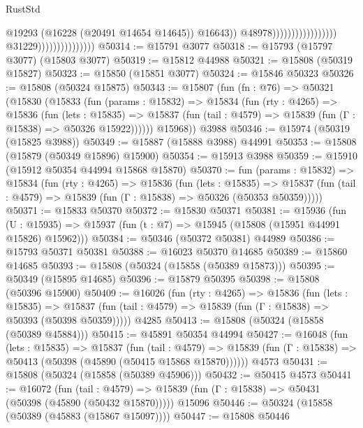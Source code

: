 \begin{lexlean}{RustStd}
\begin{coremodule}
                                                                        @19293
                                                                        (@16228
                                                                          (@20491 @14654 @14645))
                                                                        @16643))
                                                                    @48978)))))))))))))))))
                                  @31229)))))))))))))))
@50314 := @15791 @3077
@50318 := @15793 (@15797 @3077) (@15803 @3077)
@50319 := @15812 @44988
@50321 := @15808 (@50319 @15827)
@50323 := @15850 (@15851 @3077)
@50324 := @15846 @50323
@50326 := @15808 (@50324 @15875)
@50343 := @15807
    (fun (fn : @76) =>
    @50321
      (@15830
        (@15833
          (fun (params : @15832) =>
          @15834
            (fun (rty : @4265) =>
            @15836
              (fun (lets : @15835) =>
              @15837 (fun (tail : @4579) => @15839 (fun (Γ : @15838) => @50326 @15922))))))
        @15968))
    @3988
@50346 := @15974 (@50319 (@15825 @3988))
@50349 := @15887 (@15888 @3988) @44991
@50353 := @15808 (@15879 (@50349 @15896) @15900)
@50354 := @15913 @3988
@50359 := @15910 (@15912 @50354 @44994 @15868 @15870)
@50370 := fun (params : @15832) =>
  @15834
    (fun (rty : @4265) =>
    @15836
      (fun (lets : @15835) =>
      @15837 (fun (tail : @4579) => @15839 (fun (Γ : @15838) => @50326 (@50353 @50359)))))
@50371 := @15833 @50370
@50372 := @15830 @50371
@50381 := @15936
    (fun (U : @15935) => @15937 (fun (t : @7) => @15945 (@15808 (@15951 @44991 @15826) @15962)))
@50384 := @50346 (@50372 @50381) @44989
@50386 := @15793 @50371 @50381
@50388 := @16023 @50370 @14685
@50389 := @15860 @14685
@50393 := @15808 (@50324 (@15858 (@50389 @15873)))
@50395 := @50349 (@15895 @14685)
@50396 := @15879 @50395
@50398 := @15808 (@50396 @15900)
@50409 := @16026
    (fun (rty : @4265) =>
    @15836
      (fun (lets : @15835) =>
      @15837 (fun (tail : @4579) => @15839 (fun (Γ : @15838) => @50393 (@50398 @50359)))))
    @4285
@50413 := @15808 (@50324 (@15858 (@50389 @45884)))
@50415 := @45891 @50354 @44994
@50427 := @16048
    (fun (lets : @15835) =>
    @15837
      (fun (tail : @4579) =>
      @15839 (fun (Γ : @15838) => @50413 (@50398 (@45890 (@50415 @15868 @15870))))))
    @4573
@50431 := @15808 (@50324 (@15858 (@50389 @45906)))
@50432 := @50415 @4573
@50441 := @16072
    (fun (tail : @4579) => @15839 (fun (Γ : @15838) => @50431 (@50398 (@45890 (@50432 @15870)))))
    @15096
@50446 := @50324 (@15858 (@50389 (@45883 (@15867 @15097))))
@50447 := @15808 @50446

\end{coremodule}
\end{lexlean}
